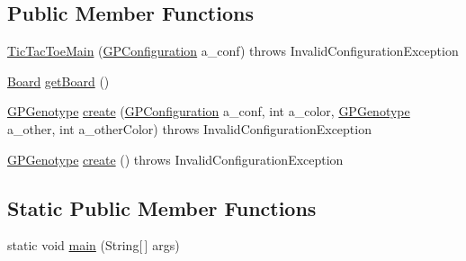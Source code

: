 \subsection*{Public Member Functions}
\begin{DoxyCompactItemize}
\item 
\hyperlink{classexamples_1_1gp_1_1tictactoe_1_1_tic_tac_toe_main_a4f12ea0821fc000305c5f2c6ff3c9490}{Tic\-Tac\-Toe\-Main} (\hyperlink{classorg_1_1jgap_1_1gp_1_1impl_1_1_g_p_configuration}{G\-P\-Configuration} a\-\_\-conf)  throws Invalid\-Configuration\-Exception 
\item 
\hyperlink{classexamples_1_1gp_1_1tictactoe_1_1_board}{Board} \hyperlink{classexamples_1_1gp_1_1tictactoe_1_1_tic_tac_toe_main_ad130661963b0bd5712a204fa64d45ccc}{get\-Board} ()
\item 
\hyperlink{classorg_1_1jgap_1_1gp_1_1impl_1_1_g_p_genotype}{G\-P\-Genotype} \hyperlink{classexamples_1_1gp_1_1tictactoe_1_1_tic_tac_toe_main_a477f163a17746606ab745ce91e9bde7f}{create} (\hyperlink{classorg_1_1jgap_1_1gp_1_1impl_1_1_g_p_configuration}{G\-P\-Configuration} a\-\_\-conf, int a\-\_\-color, \hyperlink{classorg_1_1jgap_1_1gp_1_1impl_1_1_g_p_genotype}{G\-P\-Genotype} a\-\_\-other, int a\-\_\-other\-Color)  throws Invalid\-Configuration\-Exception 
\item 
\hyperlink{classorg_1_1jgap_1_1gp_1_1impl_1_1_g_p_genotype}{G\-P\-Genotype} \hyperlink{classexamples_1_1gp_1_1tictactoe_1_1_tic_tac_toe_main_a04c93fbe377e797c50ae819f6be51019}{create} ()  throws Invalid\-Configuration\-Exception 
\end{DoxyCompactItemize}
\subsection*{Static Public Member Functions}
\begin{DoxyCompactItemize}
\item 
static void \hyperlink{classexamples_1_1gp_1_1tictactoe_1_1_tic_tac_toe_main_a59424602a8ad57ebb165328f1e6d5fac}{main} (String\mbox{[}$\,$\mbox{]} args)
\end{DoxyCompactItemize}

